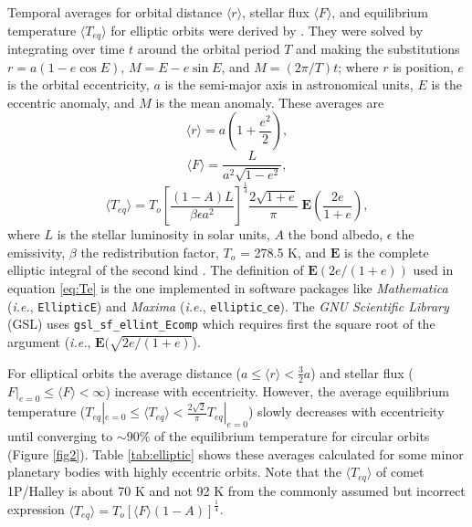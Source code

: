 \documentclass[a4paper,fleqn,usenatbib]{mnras}
\begin{document}
Temporal averages for orbital distance $\langle r \rangle$, stellar flux $\langle F \rangle$, and equilibrium temperature $\langle T_{eq} \rangle$ for elliptic orbits were derived by \citet{2017ApJ...837L...1M}. They were solved by integrating over time $t$ around the orbital period $T$ and making the substitutions $r=a(1-e\cos{E})$, $M=E-e\sin{E}$, and $M=(2\pi/T)t$; where $r$ is position, $e$ is the orbital eccentricity, $a$ is the semi-major axis in astronomical units, $E$ is the eccentric anomaly, and $M$ is the mean anomaly. These averages are
\begin{equation} \label{eq:re}
\langle r \rangle = a\left ( 1+\frac{e^2}{2} \right ),
\end{equation}
\begin{equation} \label{eq:Fe}
\langle F \rangle = \frac{L}{a^2\sqrt{1-e^2}},
\end{equation}
\begin{equation} \label{eq:Te}
\langle T_{eq} \rangle = T_o\left[ \frac{(1-A)L}{\beta \epsilon a^2}\right] ^\frac{1}{4}\frac{2\sqrt{1+e}}{\pi} \; \mathbf{E}\left ( \frac{2e}{1+e} \right ),
\end{equation}
where $L$ is the stellar luminosity in solar units, $A$ the bond albedo, $\epsilon$ the emissivity, $\beta$ the redistribution factor, $T_o$ = 278.5 K, and $\mathbf{E}$ is the complete elliptic integral of the second kind \citep{MathWorld, GSL}. The definition of $\mathbf{E}(2e/(1+e))$ used in equation \ref{eq:Te} is the one implemented in software packages like \emph{Mathematica} (\emph{i.e.}, \texttt{EllipticE}) and \emph{Maxima} (\emph{i.e.}, \texttt{elliptic$\_$ce}). The \emph{GNU Scientific Library} (GSL) uses \texttt{gsl\_sf\_ellint\_Ecomp} which requires first the square root of the argument (\emph{i.e.}, $\mathbf{E}(\sqrt{2e/(1+e)}$).

For elliptical orbits the average distance ($a \leq \langle r \rangle < \frac{3}{2}a$) and stellar flux ($F|_{e=0} \leq \langle F \rangle < \infty$) increase with eccentricity. However, the average equilibrium temperature ($T_{eq}|_{e=0} \leq \langle T_{eq} \rangle < \frac{2\sqrt{2}}{\pi} T_{eq}|_{e=0}$) slowly decreases with eccentricity until converging to $\sim90\%$ of the equilibrium temperature for circular orbits (Figure  \ref{fig2}). Table \ref{tab:elliptic} shows these averages calculated for some minor planetary bodies with highly eccentric orbits. Note that the $\langle T_{eq} \rangle$ of comet 1P/Halley is about 70 K and not 92 K from the commonly assumed but incorrect expression $\langle T_{eq} \rangle = T_o [\langle F \rangle(1-A)]^\frac{1}{4}$.
\end{document}
